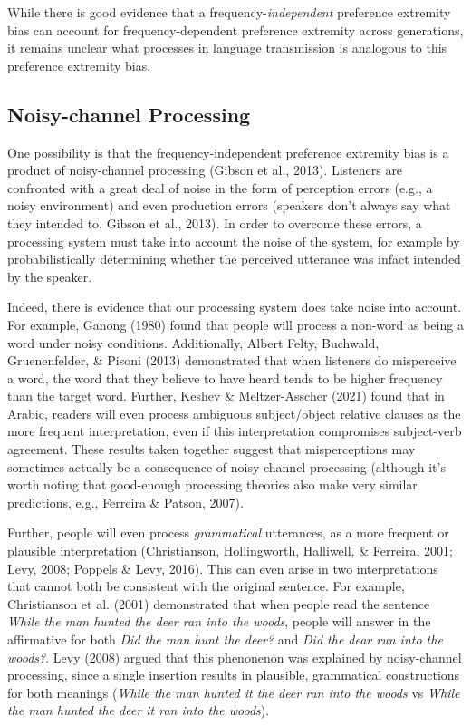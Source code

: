 \documentclass[10pt, letterpaper]{article}
\begin{document}
While there is good evidence that a frequency-\emph{independent}
preference extremity bias can account for frequency-dependent preference
extremity across generations, it remains unclear what processes in
language transmission is analogous to this preference extremity bias.

\hypertarget{noisy-channel-processing}{%
\subsection{Noisy-channel Processing}\label{noisy-channel-processing}}

One possibility is that the frequency-independent preference extremity
bias is a product of noisy-channel processing (Gibson et al., 2013).
Listeners are confronted with a great deal of noise in the form of
perception errors (e.g., a noisy environment) and even production errors
(speakers don't always say what they intended to, Gibson et al., 2013).
In order to overcome these errors, a processing system must take into
account the noise of the system, for example by probabilistically
determining whether the perceived utterance was infact intended by the
speaker.

Indeed, there is evidence that our processing system does take noise
into account. For example, Ganong (1980) found that people will process
a non-word as being a word under noisy conditions. Additionally, Albert
Felty, Buchwald, Gruenenfelder, \& Pisoni (2013) demonstrated that when
listeners do misperceive a word, the word that they believe to have
heard tends to be higher frequency than the target word. Further, Keshev
\& Meltzer-Asscher (2021) found that in Arabic, readers will even
process ambiguous subject/object relative clauses as the more frequent
interpretation, even if this interpretation compromises subject-verb
agreement. These results taken together suggest that misperceptions may
sometimes actually be a consequence of noisy-channel processing
(although it's worth noting that good-enough processing theories also
make very similar predictions, e.g., Ferreira \& Patson, 2007).

Further, people will even process \emph{grammatical} utterances, as a
more frequent or plausible interpretation (Christianson, Hollingworth,
Halliwell, \& Ferreira, 2001; Levy, 2008; Poppels \& Levy, 2016). This
can even arise in two interpretations that cannot both be consistent
with the original sentence. For example, Christianson et al. (2001)
demonstrated that when people read the sentence \emph{While the man
hunted the deer ran into the woods}, people will answer in the
affirmative for both \emph{Did the man hunt the deer?} and \emph{Did the
dear run into the woods?}. Levy (2008) argued that this phenonenon was
explained by noisy-channel processing, since a single insertion results
in plausible, grammatical constructions for both meanings (\emph{While
the man hunted it the deer ran into the woods} vs \emph{While the man
hunted the deer it ran into the woods}).
\end{document}

